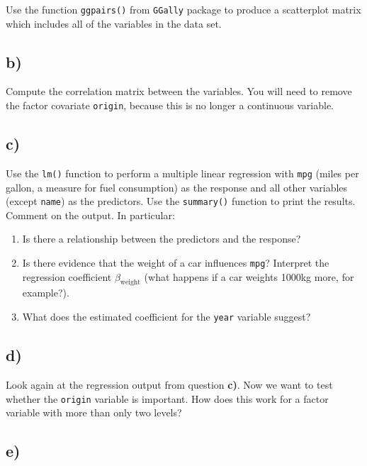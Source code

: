 \documentclass[
]{article}
\begin{document}
Use the function \texttt{ggpairs()} from \texttt{GGally} package to
produce a scatterplot matrix which includes all of the variables in the
data set.

\hypertarget{b}{%
\subsection{b)}\label{b}}

Compute the correlation matrix between the variables. You will need to
remove the factor covariate \texttt{origin}, because this is no longer a
continuous variable.

\hypertarget{c}{%
\subsection{c)}\label{c}}

Use the \texttt{lm()} function to perform a multiple linear regression
with \texttt{mpg} (miles per gallon, a measure for fuel consumption) as
the response and all other variables (except \texttt{name}) as the
predictors. Use the \texttt{summary()} function to print the results.
Comment on the output. In particular:

\begin{enumerate}
\def\labelenumi{\roman{enumi}.}
\item
  Is there a relationship between the predictors and the response?
\item
  Is there evidence that the weight of a car influences \texttt{mpg}?
  Interpret the regression coefficient \(\beta_{\text{weight}}\) (what
  happens if a car weights 1000kg more, for example?).
\item
  What does the estimated coefficient for the \texttt{year} variable
  suggest?
\end{enumerate}

\hypertarget{d}{%
\subsection{d)}\label{d}}

Look again at the regression output from question \textbf{c)}. Now we
want to test whether the \texttt{origin} variable is important. How does
this work for a factor variable with more than only two levels?

\hypertarget{e}{%
\subsection{e)}\label{e}}
\end{document}
